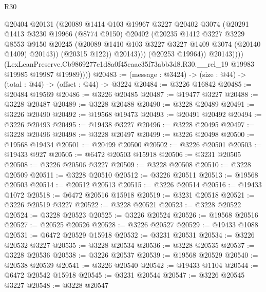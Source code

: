 \begin{lexlean}{R30}
\begin{coremodule}
                        @20404
                        @20131
                        (@20089
                          @1414
                          @103
                          @19967
                          @3227
                          @20402
                          @3074
                          (@20291
                            @1413
                            @3230
                            @19966
                            (@8774 @9150)
                            @20402
                            (@20235
                              @1412
                              @3227
                              @3229
                              @8553
                              @9150
                              @20245
                              (@20089 @1410 @103 @3227 @3227 @1409 @3074 (@20140 @1409) @20143))
                            (@20315 @122))
                          @20143)))
                    (@20253 @19964))
                  @20143))))
          (LexLeanPreserve.Cb9869277c1d8a0f45caac35f73abb3d8.R30.__rel_19
            @19983
            @19985
            @19987
            @19989))))
@20483 := (message : @3424) -> (size : @44) -> (total : @44) -> (offset : @44) -> @3224
@20484 := @3226 @16842
@20485 := @20484 @19569
@20486 := @3226 @20485
@20487 := @19477 @3227
@20488 := @3228 @20487
@20489 := @3228 @20488
@20490 := @3228 @20489
@20491 := @3226 @20490
@20492 := @19568 @19473
@20493 := @20491 @20492
@20494 := @3226 @20493
@20495 := @19438 @3227
@20496 := @3228 @20495
@20497 := @3228 @20496
@20498 := @3228 @20497
@20499 := @3226 @20498
@20500 := @19568 @19434
@20501 := @20499 @20500
@20502 := @3226 @20501
@20503 := @19433 @927
@20505 := @6472 @20503 @15918
@20506 := @3231 @20505
@20508 := @3226 @20506 @3227
@20509 := @3228 @20508
@20510 := @3228 @20509
@20511 := @3228 @20510
@20512 := @3226 @20511
@20513 := @19568 @20503
@20514 := @20512 @20513
@20515 := @3226 @20514
@20516 := @19433 @1072
@20518 := @6472 @20516 @15918
@20519 := @3231 @20518
@20521 := @3226 @20519 @3227
@20522 := @3228 @20521
@20523 := @3228 @20522
@20524 := @3228 @20523
@20525 := @3226 @20524
@20526 := @19568 @20516
@20527 := @20525 @20526
@20528 := @3226 @20527
@20529 := @19433 @1088
@20531 := @6472 @20529 @15918
@20532 := @3231 @20531
@20534 := @3226 @20532 @3227
@20535 := @3228 @20534
@20536 := @3228 @20535
@20537 := @3228 @20536
@20538 := @3226 @20537
@20539 := @19568 @20529
@20540 := @20538 @20539
@20541 := @3226 @20540
@20542 := @19433 @1104
@20544 := @6472 @20542 @15918
@20545 := @3231 @20544
@20547 := @3226 @20545 @3227
@20548 := @3228 @20547

\end{coremodule}
\end{lexlean}

